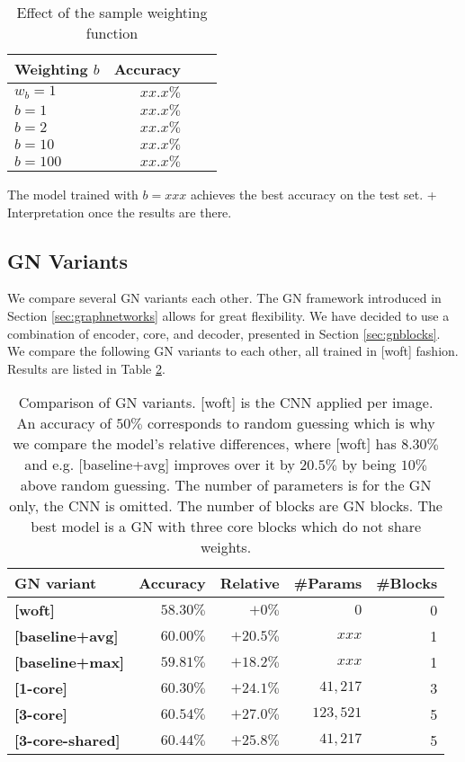 \begin{table}
    \centering
    \begin{tabular}{lrrr}
        \textbf{Weighting $b$} & \textbf{Accuracy}\\\hline
        $w_b=1$ & $xx.x\%$\\
        $b=1$ & $xx.x\%$\\
        $b=2$ & $xx.x\%$\\
        $b=10$ & $xx.x\%$\\
        $b=100$ & $xx.x\%$\\
    \end{tabular}
    \caption[Effect of the sample weighting function]{Effect of the sample weighting function}
    \label{tab:weightingbase}
\end{table}

The model trained with $b=xxx$ achieves the best accuracy on the test set. + Interpretation once the results are there.

\subsection{GN Variants}

We compare several GN variants each other. The GN framework introduced in Section \ref{sec:graphnetworks} allows for great flexibility. We have decided to use a combination of encoder, core, and decoder, presented in Section \ref{sec:gnblocks}.
We compare the following GN variants to each other, all trained in [woft] fashion. Results are listed in Table \ref{tab:gnvariantscomparison}.

\begin{table}
    \centering
    \begin{tabular}{lrrrr}
        \textbf{GN variant} & \textbf{Accuracy} & \textbf{Relative} & \textbf{\#Params} & \textbf{\#Blocks}\\\hline
        \textbf{[woft]} & $58.30\%$ & $+0\%$ & $0$ & 0 \\
        \textbf{[baseline+avg]} & $60.00\%$ & $+20.5\%$ & $xxx$ & 1\\
        \textbf{[baseline+max]} & $59.81\%$ & $+18.2\%$ & $xxx$ & 1\\
        \textbf{[1-core]} & $60.30\%$ & $+24.1\%$ & $41,217$ & 3\\
        \textbf{[3-core]} & $\bm{60.54\%}$ & $+27.0\%$ & $123,521$ & 5\\
        \textbf{[3-core-shared]} & $60.44\%$ & $+25.8\%$ & $41,217$ & 5\\
    \end{tabular}
    \caption[Comparison of GN variants]{Comparison of GN variants. [woft] is the CNN applied per image. An accuracy of $50\%$ corresponds to random guessing which is why we compare the model's relative differences, where [woft] has $8.30\%$ and e.g. [baseline+avg] improves over it by $20.5\%$ by being $10\%$ above random guessing. The number of parameters is for the GN only, the CNN is omitted. The number of blocks are GN blocks. The best model is a GN with three core blocks which do not share weights.}
    \label{tab:gnvariantscomparison}
\end{table}

